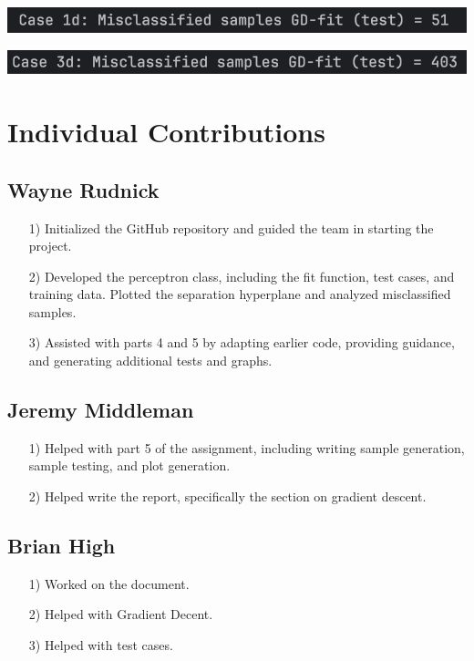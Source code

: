 \documentclass{article}
\begin{document}
\begin{center}
\includegraphics[scale=0.75]{../figs/T8.2.png} \\
\end{center}

\begin{center}
\includegraphics[scale=0.75]{../figs/T8.3.png} \\
\end{center}

\section{Individual Contributions}

\subsection{Wayne Rudnick}
\begin{itemize}
    \item[1)] Initialized the GitHub repository and guided the team in starting the project.
    \item[2)] Developed the perceptron class, including the fit function, test cases, and training data. Plotted the separation hyperplane and analyzed misclassified samples.
    \item[3)] Assisted with parts 4 and 5 by adapting earlier code, providing guidance, and generating additional tests and graphs.
\end{itemize}

\subsection{Jeremy Middleman}
\begin{itemize}
    \item[1)] Helped with part 5 of the assignment, including writing sample generation, sample testing, and plot generation.
    \item[2)] Helped write the report, specifically the section on gradient descent.
\end{itemize}

\subsection{Brian High}
\begin{itemize}
    \item[1)] Worked on the document.
    \item[2)] Helped with Gradient Decent.
    \item[3)] Helped with test cases.
\end{itemize}
\end{document}
